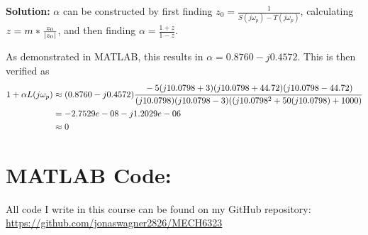 \documentclass[letter]{article}
\numberwithin{equation}{section}
\begin{document}
\textbf{Solution:}
$\alpha$ can be constructed by first finding $z_0 = \frac{1}{S(j\omega_p)-T(j\omega_p)}$, 
calculating $z = m * \frac{z_0}{\abs{z_0}}$, 
and then finding $\alpha = \frac{1+z}{1-z}$.

As demonstrated in MATLAB, this results in $\alpha = 0.8760 - j 0.4572$.
This is then verified as
\begin{align*}
	1 + \alpha L(j\omega_p) 
	&\approx (0.8760 - j 0.4572) \cfrac{
			-5 (j 10.0798+3) (j 10.0798+44.72) (j 10.0798-44.72)
		}{
			(j 10.0798) (j 10.0798-3) ((j 10.0798^2 + 50(j 10.0798) + 1000)
		}\\
	&= -2.7529e-08 - j 1.2029e-06\\
	&\approx 0
\end{align*}



\newpage
\appendix
\section{MATLAB Code:}\label{apx:matlab}
All code I write in this course can be found on my GitHub repository:\\
\href{https://github.com/jonaswagner2826/MECH6323}{https://github.com/jonaswagner2826/MECH6323}
\end{document}

